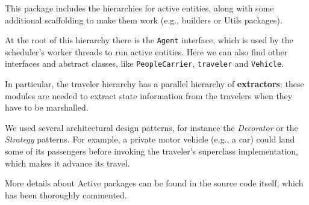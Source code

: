 This package includes the hierarchies for active entities, along with some
additional scaffolding to make them work (e.g., builders or Utils packages).

At the root of this hierarchy there is the \texttt{Agent} interface, which is
used by the scheduler's worker threads to run active entities. Here we can also
find other interfaces and abstract classes, like \texttt{PeopleCarrier},
\texttt{traveler} and \texttt{Vehicle}.

In particular, the traveler hierarchy has a parallel hierarchy of
\textbf{extractors}: these modules are needed to extract state information from
the travelers when they have to be marshalled.

We used several architectural design patterns, for instance the
\textit{Decorator} or the \textit{Strategy} patterns. For example, a private
motor vehicle (e.g., a car) could land some of its passengers before invoking
the traveler's superclass implementation, which makes it advance its travel.

More details about Active packages can be found in the source code itself,
which has been thoroughly commented.
